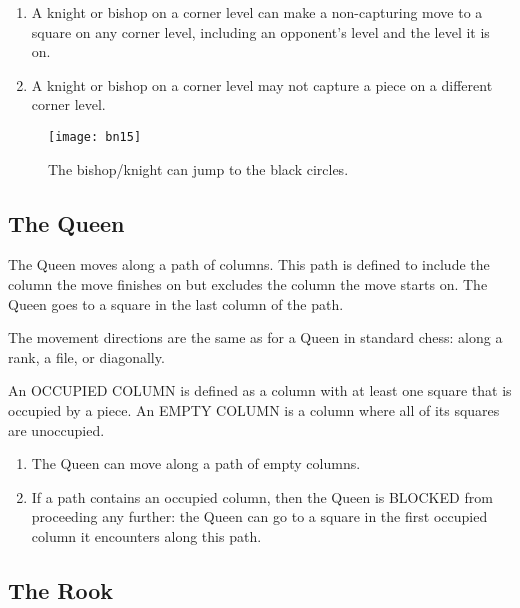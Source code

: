 \documentclass[12pt]{article} %
\begin{document}
\begin{enumerate}
\item A knight or bishop on a corner level can make a non-capturing move to a square on any corner level, including an opponent's level and the level it is on.
\item A knight or bishop on a corner level may not capture a piece on a different corner level.
\end{enumerate}

\begin{figure}[H]
\begin{center}
\texttt{[image: bn15]}
\end{center}
\label{bn}
\caption{The bishop/knight can jump to the black circles.}
\end{figure}

\subsection{The Queen}

The Queen moves along a path of columns.  This path is defined to include the column the move finishes on but excludes the column the move starts on.  The Queen goes to a square in the last column of the path.  

The movement directions are the same as for a Queen in standard chess: along a rank, a file, or diagonally.

An OCCUPIED COLUMN is defined as a column with at least one square that is occupied by a piece.  An EMPTY COLUMN is a column where all of its squares are unoccupied.

\begin{enumerate}
\item The Queen can move along a path of empty columns.  
\item If a path contains an occupied column, then the Queen is BLOCKED from proceeding any further: the Queen can go to a square in the first occupied column it encounters along this path. 
\end{enumerate}

\subsection{The Rook}
\end{document}
